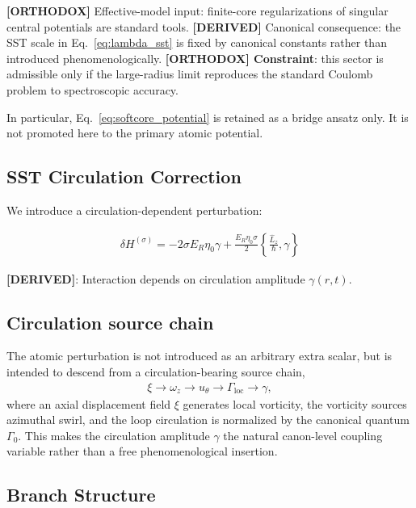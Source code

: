 \documentclass[11pt]{article}
\theoremstyle{definition}
\theoremstyle{plain}
\theoremstyle{remark}
\begin{document}
        \textbf{[ORTHODOX]} Effective-model input: finite-core regularizations of singular central potentials are standard tools.\newline
        \textbf{[DERIVED]} Canonical consequence: the SST scale in Eq.~\eqref{eq:lambda_sst} is fixed by canonical constants rather than introduced phenomenologically.\newline
        \textbf{[ORTHODOX] Constraint}: this sector is admissible only if the large-radius limit reproduces the standard Coulomb problem to spectroscopic accuracy.

        In particular, Eq.~\eqref{eq:softcore_potential} is retained as a bridge ansatz only. It is not promoted here to the primary atomic potential.

    \subsection{SST Circulation Correction}
        
        We introduce a circulation-dependent perturbation:
        
        \begin{align}
            \delta H^{(\sigma)} = -2\sigma E_R \eta_0 \gamma + \frac{E_R \eta_0 \sigma}{2} \left\{ \frac{\hat{L}_z}{\hbar}, \gamma \right\}
            \label{eq:sst_correction}
        \end{align}
        
        \textbf{[DERIVED]}: Interaction depends on circulation amplitude $\gamma(r,t)$.

    \subsection{Circulation source chain}
        The atomic perturbation is not introduced as an arbitrary extra scalar, but is intended to descend from a circulation-bearing source chain,
        \begin{align}
            \xi \rightarrow \omega_z \rightarrow u_\theta \rightarrow \Gamma_{\mathrm{loc}} \rightarrow \gamma,
        \end{align}
        where an axial displacement field $\xi$ generates local vorticity, the vorticity sources azimuthal swirl, and the loop circulation is normalized by the canonical quantum $\Gamma_0$. This makes the circulation amplitude $\gamma$ the natural canon-level coupling variable rather than a free phenomenological insertion.
    
    \subsection{Branch Structure}
        
\end{document}
